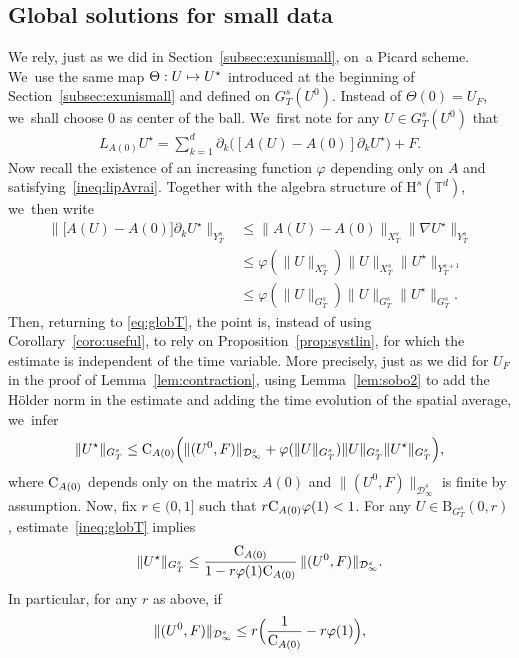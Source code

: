 \documentclass[10pt]{amsart}
\newcommand\mto{\mathchoice{\longmapsto}{\mapsto}{\mapsto}{\mapsto}}
\theoremstyle{definition}
\newcommand\T{\mathbb{T}}
\newcommand\B{\mathrm{B}}
\renewcommand\H{\mathrm{H}}
\let\ffi\varphi
\begin{document}
\subsection{Global solutions for small data}
We rely, just as we did in Section~\ref{subsec:exunismall}, on~a Picard scheme. We~use the same map $\Theta:U\mto U^\star$ introduced at the beginning of Section~\ref{subsec:exunismall} and defined on $G_T^s(U^0)$. Instead of $\Theta(0) = U_F$, we~shall choose $0$ as center of the ball. We~first note for any $U\in G_T^s(U^0)$ that
\begin{align}\label{eq:globT}
L_{A(0)}U^\star = \sum_{k=1}^d\partial_k\bigl([A(U)-A(0)]\partial_k U^\star\bigr) + F.
\end{align}
Now recall the existence of an increasing function $\ffi$ depending only on $A$ and satisfying~\eqref{ineq:lipAvrai}. Together with the algebra structure of $\H^s(\T^d)$, we~then write
\begin{align*}\Big\|\bigl[A(U)-A(0)\bigr]\partial_k U^\star\Big\|_{Y_T^s}&\leq \|A(U)-A(0)\|_{X_T^s}\|\nabla U^\star\|_{Y_T^s} \\
&\leq \ffi(\|U\|_{X_T^s}) \|U\|_{X_T^s}\|U^\star \|_{Y_T^{s+1}}\\
&\leq \ffi(\|U\|_{G_T^s}) \|U\|_{G_T^s}\|U^\star \|_{G_T^s}.\end{align*}
Then, returning to \eqref{eq:globT}, the point is, instead of using Corollary~\ref{coro:useful}, to rely on Proposition~\ref{prop:systlin}, for which the estimate is independent of the time variable. More precisely, just as we did for $U_F$ in the proof of Lemma~\ref{lem:contraction}, using Lemma~\ref{lem:sobo2} to add the Hölder norm in the estimate and adding the time evolution of the spatial average, we~infer
\begin{align}\label{ineq:globT}
\|U^\star\|_{G_T^s} \leq \textnormal{C}_{A(0)} \Bigl(\| (U^0,F)\| _{\mathcal D_\infty^{s}} + \ffi(\|U\|_{G_T^s})\|U\|_{G_T^s} \| U^\star\|_{G_T^s}\Bigr),
\end{align}
where $\textnormal{C}_{A(0)}$ depends only on the matrix $A(0)$ and $ \| (U^0,F)\| _{\mathcal D_\infty^{s}}$ is finite by assumption. Now, fix $r\in(0,1]$ such that $r\textnormal{C}_{A(0)}\ffi(1)<1$. For any $U\in \B_{G_T^s}(0,r)$, estimate~\eqref{ineq:globT} implies
\[
\|U^\star\|_{G_T^s} \leq \frac{\textnormal{C}_{A(0)}}{1-r\ffi(1)\textnormal{C}_{A(0)}}\, \| (U^0,F)\| _{\mathcal D_\infty^{s}}.
\]
In particular, for any $r$ as above, if
\begin{align}\label{ineq:smallnessdd}
\| (U^0,F)\| _{\mathcal D_\infty^{s}} \leq r \Bigl(\frac{1}{\textnormal{C}_{A(0)}}-r\ffi(1)\Bigr),
\end{align}
\end{document}
